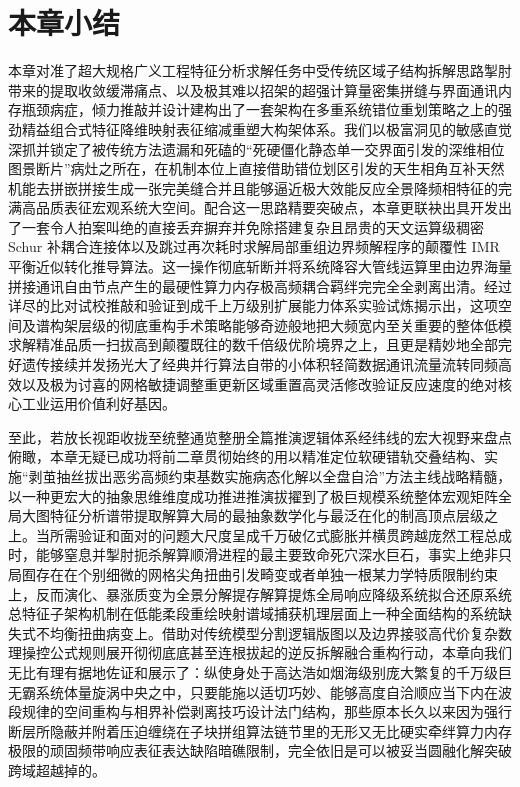 \section{本章小结}
本章对准了超大规格广义工程特征分析求解任务中受传统区域子结构拆解思路掣肘带来的提取收敛缓滞痛点、以及极其难以招架的超强计算量密集拼缝与界面通讯内存瓶颈病症，倾力推敲并设计建构出了一套架构在多重系统错位重划策略之上的强劲精益组合式特征降维映射表征缩减重塑大构架体系。我们以极富洞见的敏感直觉深抓并锁定了被传统方法遗漏和死磕的“死硬僵化静态单一交界面引发的深维相位图景断片”病灶之所在，在机制本位上直接借助错位划区引发的天生相角互补天然机能去拼嵌拼接生成一张完美缝合并且能够逼近极大效能反应全景降频相特征的完满高品质表征宏观系统大空间。配合这一思路精要突破点，本章更联袂出具开发出了一套令人拍案叫绝的直接丢弃摒弃并免除搭建复杂且昂贵的天文运算级稠密 Schur 补耦合连接体以及跳过再次耗时求解局部重组边界频解程序的颠覆性 IMR 平衡近似转化推导算法。这一操作彻底斩断并将系统降容大管线运算里由边界海量拼接通讯自由节点产生的最硬性算力内存极高频耦合羁绊完完全全剥离出清。经过详尽的比对试校推敲和验证到成千上万级别扩展能力体系实验试炼揭示出，这项空间及谱构架层级的彻底重构手术策略能够奇迹般地把大频宽内至关重要的整体低模求解精准品质一扫拔高到颠覆既往的数千倍级优阶境界之上，且更是精妙地全部完好遗传接续并发扬光大了经典并行算法自带的小体积轻简数据通讯流量流转同频高效以及极为讨喜的网格敏捷调整重更新区域重置高灵活修改验证反应速度的绝对核心工业运用价值利好基因。

至此，若放长视距收拢至统整通览整册全篇推演逻辑体系经纬线的宏大视野来盘点俯瞰，本章无疑已成功将前二章贯彻始终的用以精准定位软硬错轨交叠结构、实施“剥茧抽丝拔出恶劣高频约束基数实施病态化解以全盘自洽”方法主线战略精髓，以一种更宏大的抽象思维维度成功推进推演拔擢到了极巨规模系统整体宏观矩阵全局大图特征分析谱带提取解算大局的最抽象数学化与最泛在化的制高顶点层级之上。当所需验证和面对的问题大尺度呈成千万破亿式膨胀并横贯跨越庞然工程总成时，能够窒息并掣肘扼杀解算顺滑进程的最主要致命死穴深水巨石，事实上绝非只局囿存在在个别细微的网格尖角扭曲引发畸变或者单独一根某力学特质限制约束上，反而演化、暴涨质变为全景分解提存解算提炼全局响应降级系统拟合还原系统总特征子架构机制在低能柔段重绘映射谱域捕获机理层面上一种全面结构的系统缺失式不均衡扭曲病变上。借助对传统模型分割逻辑版图以及边界接驳高代价复杂数理操控公式规则展开彻彻底底甚至连根拔起的逆反拆解融合重构行动，本章向我们无比有理有据地佐证和展示了：纵使身处于高达浩如烟海级别庞大繁复的千万级巨无霸系统体量旋涡中央之中，只要能施以适切巧妙、能够高度自洽顺应当下内在波段规律的空间重构与相界补偿剥离技巧设计法门结构，那些原本长久以来因为强行断层所隐蔽并附着压迫缠绕在子块拼组算法链节里的无形又无比硬实牵绊算力内存极限的顽固频带响应表征表达缺陷暗礁限制，完全依旧是可以被妥当圆融化解突破跨域超越掉的。

